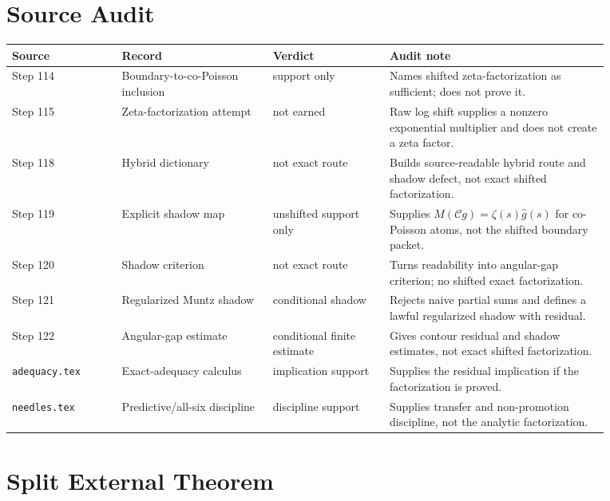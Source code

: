 \documentclass[11pt]{article}
\begin{document}
\section*{Source Audit}

\begin{center}
\small
\begin{tabular}{@{}p{0.16\linewidth}p{0.22\linewidth}p{0.17\linewidth}p{0.32\linewidth}@{}}
\toprule
Source & Record & Verdict & Audit note\\
\midrule
Step 114 & Boundary-to-co-Poisson inclusion & support only &
Names shifted zeta-factorization as sufficient; does not prove it.\\
Step 115 & Zeta-factorization attempt & not earned &
Raw log shift supplies a nonzero exponential multiplier and does not create a zeta factor.\\
Step 118 & Hybrid dictionary & not exact route &
Builds source-readable hybrid route and shadow defect, not exact shifted factorization.\\
Step 119 & Explicit shadow map & unshifted support only &
Supplies \(M(\mathcal Cg)=\zeta(s)\widehat g(s)\) for co-Poisson atoms, not the shifted boundary packet.\\
Step 120 & Shadow criterion & not exact route &
Turns readability into angular-gap criterion; no shifted exact factorization.\\
Step 121 & Regularized Muntz shadow & conditional shadow &
Rejects naive partial sums and defines a lawful regularized shadow with residual.\\
Step 122 & Angular-gap estimate & conditional finite estimate &
Gives contour residual and shadow estimates, not exact shifted factorization.\\
\texttt{adequacy.tex} & Exact-adequacy calculus & implication support &
Supplies the residual implication if the factorization is proved.\\
\texttt{needles.tex} & Predictive/all-six discipline & discipline support &
Supplies transfer and non-promotion discipline, not the analytic factorization.\\
\bottomrule
\end{tabular}
\end{center}

\section*{Split External Theorem}
\end{document}
